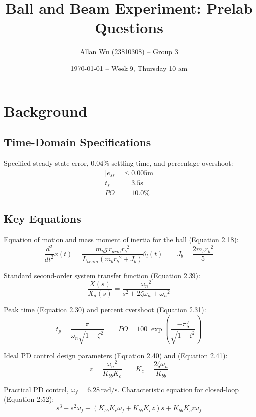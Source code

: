 \documentclass[12pt]{article}
\title{Ball and Beam Experiment: Prelab Questions}
\author{Allan Wu (23810308) -- Group 3}
\date{\today{} -- Week 9, Thursday 10 am}
\begin{document}
\maketitle{}

\section*{Background}

\subsection*{Time-Domain Specifications}
Specified steady-state error, 0.04\% settling time, and percentage overshoot:
\begin{align*}
|e_{ss}| &\leq 0.005 \mathrm{ m}\\
t_s &= 3.5 \mathrm{ s}\\
PO &= 10.0 \mathrm{\%}
\end{align*}

\subsection*{Key Equations}
Equation of motion and mass moment of inertia for the ball (Equation 2.18):
\begin{equation*}
\frac{d^2}{dt^2} x(t) = \frac{m_b g\,r_{arm}{r_b}^2 }{L_{beam}\left(m_b {r_b}^2 + J_b\right)} \theta_l(t) \qquad J_b = \frac{2 m_b {r_b}^2}{5} 
\end{equation*}

Standard second-order system transfer function (Equation 2.39):
\begin{equation*}
\frac{X(s)}{X_d(s)} = \frac{{\omega_n}^2}{s^2 + 2 \zeta \omega_n + {\omega_n}^2} 
\end{equation*}

Peak time (Equation 2.30) and percent overshoot (Equation 2.31):
\begin{equation*}
t_p = \frac{\pi}{\omega_n \sqrt{1 - \zeta^2}} \qquad PO = 100\;\exp \left(\frac{-\pi \zeta}{\sqrt{1 - \zeta ^2}} \right)
\end{equation*}

Ideal PD control design parameters (Equation 2.40) and (Equation 2.41):
\begin{equation*}
z = \frac{{\omega_n}^2}{K_{bb}K_c} \qquad K_c = \frac{2 \zeta \omega_n}{K_{bb}} 
\end{equation*}

Practical PD control, $\omega_f = 6.28 \mathrm{ \, rad/s}$. Characteristic equation for closed-loop (Equation 2:52):
\begin{equation*}
s^3 + s^2 \omega_f + (K_{bb}K_c \omega_f + K_{bb}K_c z)s + K_{bb} K_c z \omega_f
\end{equation*}
\end{document}
